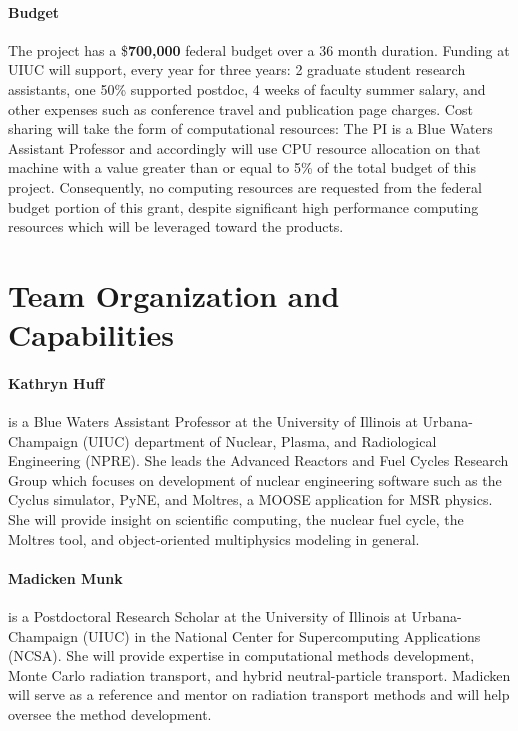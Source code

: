\documentclass[letterpaper,12pt]{article}
\begin{document}
\paragraph{Budget} The project has a \$\textbf{700,000} federal budget over a
36 month duration. Funding at UIUC will support, every year for three years: 2
graduate student research assistants, one 50\% supported postdoc, 4 weeks of
faculty summer salary, and other expenses such as conference travel and
publication page charges. Cost sharing will take the form of computational
resources: The PI is a Blue Waters Assistant Professor and accordingly will
use CPU resource allocation on that machine with a value greater than or equal
to 5\% of the total budget of this project. Consequently, no computing
resources are requested from the federal budget portion of this grant, despite
significant high performance computing resources which will be leveraged toward
the products.


\section{Team Organization and Capabilities}

\paragraph{Kathryn Huff} is a Blue Waters Assistant Professor at the University
of Illinois at Urbana-Champaign (UIUC) department of Nuclear, Plasma, and
Radiological Engineering (NPRE). She leads the Advanced Reactors and Fuel
Cycles Research Group which focuses on development of nuclear engineering
software such as the Cyclus simulator, PyNE, and Moltres, a MOOSE application
for MSR physics. She will provide insight on scientific computing, the nuclear
fuel cycle, the Moltres tool, and object-oriented multiphysics modeling in
general.

\paragraph{Madicken Munk} is a Postdoctoral Research Scholar at the University
of Illinois at Urbana-Champaign (UIUC) in the National Center for Supercomputing
Applications (NCSA). She will provide expertise in computational methods
development, Monte Carlo radiation transport, and hybrid neutral-particle
transport. Madicken will serve as a reference and mentor on radiation transport
methods and will help oversee the method development.
\end{document}
